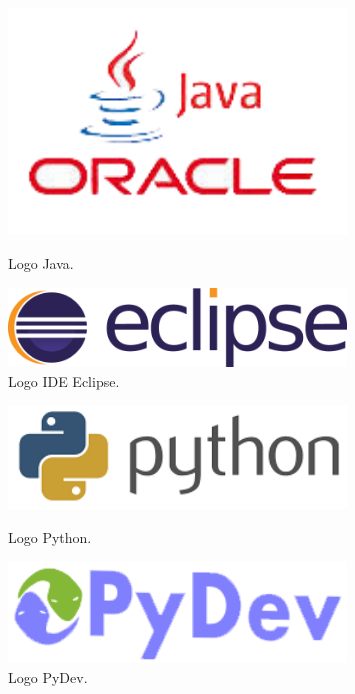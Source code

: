\documentclass[twoside,12pt]{report}
\begin{document}
\begin{figure}[ht]
\begin{flushleft}
	\begin{minipage}[]{.47\textwidth}
	\centering
	\includegraphics[width=0.8\textwidth]{img/java}
	\caption{Logo Java.}
\end{minipage}%
\end{flushleft}
\begin{flushright}
	\begin{minipage}[]{.47\textwidth}
	\centering
	\includegraphics[width=0.8\textwidth]{img/eclipse}
	\caption{Logo IDE Eclipse.}	
	\end{minipage}
\end{flushright}
\end{figure}

\begin{figure}[ht]
\begin{flushleft}
	\begin{minipage}[]{.47\textwidth}
	\vspace*{30px}
	\centering
	\includegraphics[width=0.8\textwidth]{img/py}
	\caption{Logo Python.}
	\end{minipage}%
\end{flushleft}
\begin{flushright}
	\begin{minipage}[]{.47\textwidth}
	\centering
	\includegraphics[width=0.8\textwidth]{img/pydev}
	\caption{Logo PyDev.}
	\end{minipage}
\end{flushright}
\end{figure}
\end{document}
